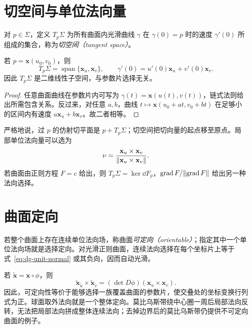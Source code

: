 \section{切空间与单位法向量}
\begin{definition}[切空间]
对 $p\in\Sigma$，定义 $T_p\Sigma$ 为所有曲面内光滑曲线 $\gamma$ 在 $\gamma(0)=p$ 时的速度 $\gamma'(0)$ 所组成的集合，称为\emph{切空间（tangent space）}。
\end{definition}
\begin{proposition}[切空间的坐标描述]
若 $p=\mathbf x(u_0,v_0)$，则
\begin{equation}
 T_p\Sigma=\operatorname{span}\{\mathbf x_u,\mathbf x_v\},
 \qquad
 \gamma'(0)=u'(0)\mathbf x_u+v'(0)\mathbf x_v.
 \label{eq:dg-tangent}
\end{equation}
因此 $T_p\Sigma$ 是二维线性子空间，与参数片选择无关。
\end{proposition}
\begin{proof}
任意曲面曲线在参数片内可写为 $\gamma(t)=\mathbf x(u(t),v(t))$，链式法则给出所需包含关系。反过来，对任意 $a,b$，曲线 $t\mapsto\mathbf x(u_0+at,v_0+bt)$ 在足够小的区间内有速度 $a\mathbf x_u+b\mathbf x_v$。故二者相等。
\end{proof}
严格地说，过 $p$ 的仿射切平面是 $p+T_p\Sigma$；切空间把切向量的起点移至原点。局部单位法向量可以选为
\begin{equation}
 \nu=\frac{\mathbf x_u\times\mathbf x_v}{\lVert \mathbf x_u\times\mathbf x_v\rVert}.
 \label{eq:dg-unit-normal}
\end{equation}
若曲面由正则方程 $F=c$ 给出，则 $T_p\Sigma=\ker\dd F_p$，$\operatorname{grad} F/\lVert \operatorname{grad} F\rVert$ 给出另一种法向选择。

\section{曲面定向}
\begin{definition}[可定向曲面]
若整个曲面上存在连续单位法向场，称曲面\emph{可定向（orientable）}；指定其中一个单位法向场就是选择定向。对光滑正则曲面，连续法向选择在每个坐标片上等于式~\eqref{eq:dg-unit-normal} 或其负向，因而自动光滑。
\end{definition}
若 $\widetilde{\mathbf x}=\mathbf x\circ\phi$，则
\[
 \widetilde{\mathbf x}_{\widetilde u}\times
 \widetilde{\mathbf x}_{\widetilde v}
 =(\det D\phi)(\mathbf x_u\times\mathbf x_v).
\]
因此，可定向性等价于能够选择一族覆盖曲面的参数片，使交叠处的坐标变换行列式为正。球面取外法向就是一个整体定向。莫比乌斯带绕中心圈一周后局部法向反转，无法把局部法向拼成整体连续法向；去掉边界后的莫比乌斯带仍提供不可定向曲面的例子。

